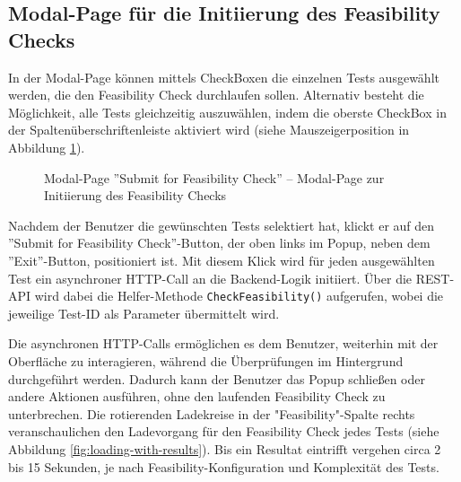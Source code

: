 \subsection{Modal-Page für die Initiierung des Feasibility Checks}

In der Modal-Page können mittels CheckBoxen die einzelnen Tests ausgewählt werden, die den Feasibility Check durchlaufen sollen. Alternativ besteht die Möglichkeit, alle Tests gleichzeitig auszuwählen, indem die oberste CheckBox in der Spaltenüberschriftenleiste aktiviert wird (siehe Mauszeigerposition in Abbildung \ref{fig:submit-page}).

\begin{figure}[!htbp] 
    \centering 
    \caption{Modal-Page ''Submit for Feasibility Check'' – Modal-Page zur Initiierung des Feasibility Checks} 
    \label{fig:submit-page} 
\end{figure}

Nachdem der Benutzer die gewünschten Tests selektiert hat, klickt er auf den ''Submit for Feasibility Check''-Button, der oben links im Popup, neben dem ''Exit''-Button, positioniert ist. Mit diesem Klick wird für jeden ausgewählten Test ein asynchroner HTTP-Call an die Backend-Logik initiiert. Über die REST-API wird dabei die Helfer-Methode \texttt{CheckFeasibility()} aufgerufen, wobei die jeweilige Test-ID als Parameter übermittelt wird.

Die asynchronen HTTP-Calls ermöglichen es dem Benutzer, weiterhin mit der Oberfläche zu interagieren, während die Überprüfungen im Hintergrund durchgeführt werden. Dadurch kann der Benutzer das Popup schließen oder andere Aktionen ausführen, ohne den laufenden Feasibility Check zu unterbrechen. Die rotierenden Ladekreise in der "Feasibility"-Spalte rechts veranschaulichen den Ladevorgang für den Feasibility Check jedes Tests (siehe Abbildung \ref{fig:loading-with-results}). Bis ein Resultat eintrifft vergehen circa 2 bis 15 Sekunden, je nach Feasibility-Konfiguration und Komplexität des Tests.


